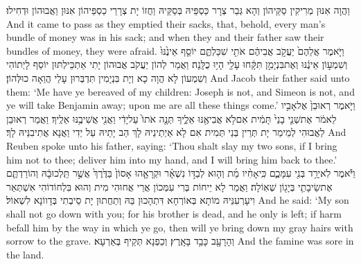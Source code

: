 {וַהֲוָה אִנּוּן מְרִיקִין סַקֵּיהוֹן וְהָא גְּבַר צְרָר כַּסְפֵּיהּ בְּסַקֵּיהּ וַחֲזוֹ יָת צְרָרֵי כַסְפֵּיהוֹן אִנּוּן וַאֲבוּהוֹן וּדְחִילוּ׃}
{And it came to pass as they emptied their sacks, that, behold, every man’s bundle of money was in his sack; and when they and their father saw their bundles of money, they were afraid.}{}
{וַיֹּ֤אמֶר אֲלֵהֶם֙ יַעֲקֹ֣ב אֲבִיהֶ֔ם אֹתִ֖י שִׁכַּלְתֶּ֑ם יוֹסֵ֤ף אֵינֶ֙נּוּ֙ וְשִׁמְע֣וֹן אֵינֶ֔נּוּ וְאֶת\maqqaf בִּנְיָמִ֣ן תִּקָּ֔חוּ עָלַ֖י הָי֥וּ כֻלָּֽנָה׃}
{וַאֲמַר לְהוֹן יַעֲקֹב אֲבוּהוֹן יָתִי אַתְכֵּילְתּוּן יוֹסֵף לָיְתוֹהִי וְשִׁמְעוֹן לָא הֲוָה כָא וְיָת בִּנְיָמִין תִּדְבְּרוּן עָלַי הֲוַאָה כוּלְּהוֹן׃}
{And Jacob their father said unto them: ‘Me have ye bereaved of my children: Joseph is not, and Simeon is not, and ye will take Benjamin away; upon me are all these things come.’}{}
{וַיֹּ֤אמֶר רְאוּבֵן֙ אֶל\maqqaf אָבִ֣יו לֵאמֹ֔ר אֶת\maqqaf שְׁנֵ֤י בָנַי֙ תָּמִ֔ית אִם\maqqaf לֹ֥א אֲבִיאֶ֖נּוּ אֵלֶ֑יךָ תְּנָ֤ה אֹתוֹ֙ עַל\maqqaf יָדִ֔י וַאֲנִ֖י אֲשִׁיבֶ֥נּוּ אֵלֶֽיךָ׃}
{וַאֲמַר רְאוּבֵן לַאֲבוּהִי לְמֵימַר יָת תְּרֵין בְּנַי תְּמִית אִם לָא אַיְתֵינֵיהּ לָךְ הַב יָתֵיהּ עַל יְדִי וַאֲנָא אֲתִיבִנֵּיהּ לָךְ׃}
{And Reuben spoke unto his father, saying: ‘Thou shalt slay my two sons, if I bring him not to thee; deliver him into my hand, and I will bring him back to thee.’}{}
{וַיֹּ֕אמֶר לֹֽא\maqqaf יֵרֵ֥ד בְּנִ֖י עִמָּכֶ֑ם כִּֽי\maqqaf אָחִ֨יו מֵ֜ת וְה֧וּא לְבַדּ֣וֹ נִשְׁאָ֗ר וּקְרָאָ֤הוּ אָסוֹן֙ בַּדֶּ֙רֶךְ֙ אֲשֶׁ֣ר תֵּֽלְכוּ\maqqaf בָ֔הּ וְהוֹרַדְתֶּ֧ם אֶת\maqqaf שֵׂיבָתִ֛י בְּיָג֖וֹן שְׁאֽוֹלָה׃}
{וַאֲמַר לָא יֵיחוֹת בְּרִי עִמְּכוֹן אֲרֵי אֲחוּהִי מִית וְהוּא בִּלְחוֹדוֹהִי אִשְׁתְּאַר וִיעָרְעִנֵּיהּ מוֹתָא בְּאוֹרְחָא דִּתְהָכוּן בַּהּ וְתַחֲתוּן יָת סֵיבְתִי בְּדָווֹנָא לִשְׁאוֹל׃}
{And he said: ‘My son shall not go down with you; for his brother is dead, and he only is left; if harm befall him by the way in which ye go, then will ye bring down my gray hairs with sorrow to the grave.}{}
\newperek
{}%
{וְהָרָעָ֖ב כָּבֵ֥ד בָּאָֽרֶץ׃}
{וְכַפְנָא תְּקֵיף בְּאַרְעָא׃}
{And the famine was sore in the land.}{}
